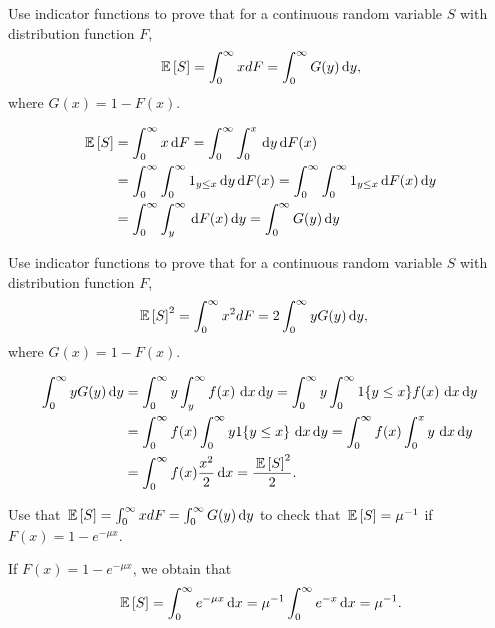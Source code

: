 \begin{question}
 Use indicator functions to prove that for  a continuous random
    variable $S$ with distribution function $F$, 
\begin{align*}
    \,\mathbb{E}\left[S\right] &= \int_0^\infty x dF  = \int_0^\infty G(y) \,\text{d}y,\\
\end{align*}
where $G(x) = 1 - F(x)$. 
\begin{solution}
\begin{equation*}
  \begin{split}
    \,\mathbb{E}\left[S\right] &= \int_0^\infty x \,\text{d}F  = \int_0^\infty \int_0^x \,\text{d}y \,\text{d}F(x) \\
    & = \int_0^\infty \int_0^\infty 1_{y\leq x} \,\text{d}y \,\text{d}F(x)   = \int_0^\infty \int_0^\infty 1_{y\leq x} \,\text{d}F(x) \,\text{d}y\\
    & = \int_0^\infty \int_y^\infty \,\text{d}F(x) \,\text{d}y = \int_0^\infty G(y) \,\text{d}y
  \end{split}
\end{equation*}
\end{solution}
\end{question}

\begin{question}
 Use indicator functions to prove that for  a continuous random
    variable $S$ with distribution function $F$, 
\begin{align*}
    \,\mathbb{E}\left[S\right]^2 &= \int_0^\infty x^2 dF  = 2 \int_0^\infty y G(y) \,\text{d}y,
\end{align*}
where $G(x) = 1 - F(x)$. 
\begin{solution}
  \begin{equation*}
    \begin{split}
\int_0^\infty y G(y) \,\text{d}y 
&=  \int_0^\infty y \int_y^\infty f(x)\, \,\text{d}x \,\text{d}y =  \int_0^\infty y \int_0^\infty 1\{y\leq x\}f(x)\, \,\text{d}x \,\text{d}y\\
&=  \int_0^\infty f(x) \int_0^\infty y 1\{y \leq x\}\, \,\text{d}x \,\text{d}y
=  \int_0^\infty f(x) \int_0^x y\, \,\text{d}x \,\text{d}y\\
&=  \int_0^\infty f(x) \frac{x^2}2 \,\text{d}x =\frac{\,\mathbb{E}\left[S\right]^2}2.
    \end{split}
  \end{equation*}
\end{solution}
\end{question}


\begin{question}
  Use that $\,\mathbb{E}\left[S\right] = \int_0^\infty x dF = \int_0^\infty G(y) \,\text{d}y$ to
  check that  $\,\mathbb{E}\left[S\right] = \mu^{-1}$ if $F(x) = 1 - e^{-\mu x}$.
\begin{solution}
If $F(x) = 1 - e^{-\mu x}$, we obtain that 
\begin{equation*}
  \,\mathbb{E}\left[S\right] = \int_0^\infty e^{-\mu x} \,\text{d}x =
  \mu^{-1}\int_0^\infty e^{-x} \,\text{d}x = \mu^{-1}.
\end{equation*}
\end{solution}
\end{question}




